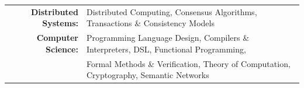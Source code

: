 
\vspace{1em}
\begin{tabular}{rl}

    \textbf{Distributed Systems:} & Distributed Computing, Consensus Algorithms, Transactions \& Consistency Models \\
    \textbf{Computer Science:} & Programming Language Design, Compilers \& Interpreters, DSL, Functional Programming,\\
                               & Formal Methods \& Verification, Theory of Computation, Cryptography, Semantic Networks \\

\end{tabular}
